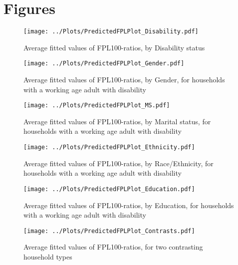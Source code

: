 
\section{Figures}

\begin{figure}[H]
\caption{Average fitted values of FPL100-ratios, by Disability status}
\centering
\texttt{[image: ../Plots/PredictedFPLPlot\_Disability.pdf]}
\label{fig:disability}
\end{figure}

\begin{figure}[H]
\caption{Average fitted values of FPL100-ratios, by Gender, for households with a working age adult with disability}
\centering
\texttt{[image: ../Plots/PredictedFPLPlot\_Gender.pdf]}
\label{fig:gender}
\end{figure}

\begin{figure}[H]
\caption{Average fitted values of FPL100-ratios, by Marital status, for households with a working age adult with disability}
\centering
\texttt{[image: ../Plots/PredictedFPLPlot\_MS.pdf]}
\label{fig:MS}
\end{figure}

\begin{figure}[H]
\caption{Average fitted values of FPL100-ratios, by Race/Ethnicity, for households with a working age adult with disability}
\centering
\texttt{[image: ../Plots/PredictedFPLPlot\_Ethnicity.pdf]}
\label{fig:race}
\end{figure}

\begin{figure}[H]
\caption{Average fitted values of FPL100-ratios, by Education, for households with a working age adult with disability}
\centering
\texttt{[image: ../Plots/PredictedFPLPlot\_Education.pdf]}
\label{fig:education}
\end{figure}

\begin{figure}[H]
\caption{Average fitted values of FPL100-ratios, for two contrasting household types}
\centering
\texttt{[image: ../Plots/PredictedFPLPlot\_Contrasts.pdf]}
\label{fig:contrasts}
\end{figure}


